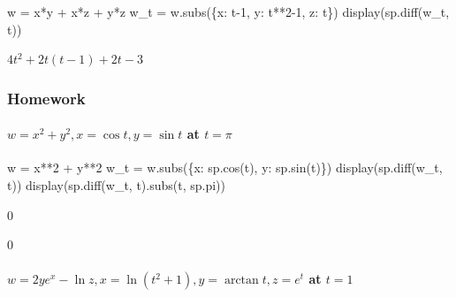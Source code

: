 \documentclass[
  letterpaper,
  DIV=11,
  numbers=noendperiod]{scrartcl}
\let\oldparagraph\paragraph
\renewcommand{\paragraph}[1]{\oldparagraph{#1}\mbox{}}
\newenvironment{Shaded}{\begin{snugshade}}{\end{snugshade}}
\newcommand{\DecValTok}[1]{\textcolor[rgb]{0.68,0.00,0.00}{#1}}
\newcommand{\NormalTok}[1]{\textcolor[rgb]{0.00,0.23,0.31}{#1}}
\newcommand{\OperatorTok}[1]{\textcolor[rgb]{0.37,0.37,0.37}{#1}}
\begin{document}
\begin{Shaded}
\begin{Highlighting}[numbers=left,,]
\NormalTok{w }\OperatorTok{=}\NormalTok{ x}\OperatorTok{*}\NormalTok{y }\OperatorTok{+}\NormalTok{ x}\OperatorTok{*}\NormalTok{z }\OperatorTok{+}\NormalTok{ y}\OperatorTok{*}\NormalTok{z}
\NormalTok{w\_t }\OperatorTok{=}\NormalTok{ w.subs(\{x: t}\OperatorTok{{-}}\DecValTok{1}\NormalTok{, y: t}\OperatorTok{**}\DecValTok{2}\OperatorTok{{-}}\DecValTok{1}\NormalTok{, z: t\})}
\NormalTok{display(sp.diff(w\_t, t))}
\end{Highlighting}
\end{Shaded}

$\displaystyle 4 t^{2} + 2 t \left(t - 1\right) + 2 t - 3$

\hypertarget{homework-2}{%
\subsubsection{Homework}\label{homework-2}}

\hypertarget{w-x2y2-xcos-t-ysin-t-at-tpi}{%
\paragraph{\texorpdfstring{\(w = x^2+y^2, x=\cos t, y=\sin t\) at
\(t=\pi\)}{w = x\^{}2+y\^{}2, x=\textbackslash cos t, y=\textbackslash sin t at t=\textbackslash pi}}\label{w-x2y2-xcos-t-ysin-t-at-tpi}}

\begin{Shaded}
\begin{Highlighting}[numbers=left,,]
\NormalTok{w }\OperatorTok{=}\NormalTok{ x}\OperatorTok{**}\DecValTok{2} \OperatorTok{+}\NormalTok{ y}\OperatorTok{**}\DecValTok{2}
\NormalTok{w\_t }\OperatorTok{=}\NormalTok{ w.subs(\{x: sp.cos(t), y: sp.sin(t)\})}
\NormalTok{display(sp.diff(w\_t, t))}
\NormalTok{display(sp.diff(w\_t, t).subs(t, sp.pi))}
\end{Highlighting}
\end{Shaded}

$\displaystyle 0$

$\displaystyle 0$

\hypertarget{w-2yex---ln-z-x-lnt2-1-y-arctan-t-zet-at-t1}{%
\paragraph{\texorpdfstring{\(w = 2ye^x - \ln z, x = \ln(t^2 + 1), y = \arctan t, z=e^t\)
at
\(t=1\)}{w = 2ye\^{}x - \textbackslash ln z, x = \textbackslash ln(t\^{}2 + 1), y = \textbackslash arctan t, z=e\^{}t at t=1}}\label{w-2yex---ln-z-x-lnt2-1-y-arctan-t-zet-at-t1}}
\end{document}
